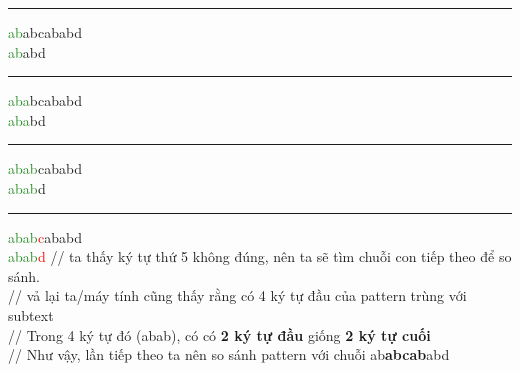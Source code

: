 \documentclass[a4paper,11pt]{article}
\begin{document}
\begin{enumerate}
			\vspace*{2mm}
			\hrule
			\textcolor{ForestGreen}{ab}abcababd\\
			\textcolor{ForestGreen}{ab}abd
			
			\vspace*{2mm}
			\hrule
			\textcolor{ForestGreen}{aba}bcababd\\
			\textcolor{ForestGreen}{aba}bd

			\vspace*{2mm}
			\hrule
			\textcolor{ForestGreen}{abab}cababd\\
			\textcolor{ForestGreen}{abab}d

			\vspace*{2mm}
			\hrule
			\textcolor{ForestGreen}{abab}\textcolor{red}{c}ababd\\
			\textcolor{ForestGreen}{abab}\textcolor{red}{d}			\hspace*{1.8cm} // ta thấy ký tự thứ 5 không đúng, nên ta sẽ tìm chuỗi con tiếp theo để so sánh. \\
																	\hspace*{2.9cm} // vả lại ta/máy tính cũng thấy rằng có 4 ký tự đầu của pattern trùng với subtext \\
																	\hspace*{2.9cm} // Trong 4 ký tự đó (abab), có có \textbf{2 ký tự đầu} giống \textbf{2 ký tự cuối} \\
																	\hspace*{2.9cm} // Như vậy, lần tiếp theo ta nên so sánh pattern với chuỗi ab\textbf{abcab}abd 
																	

\end{enumerate}
\end{document}
